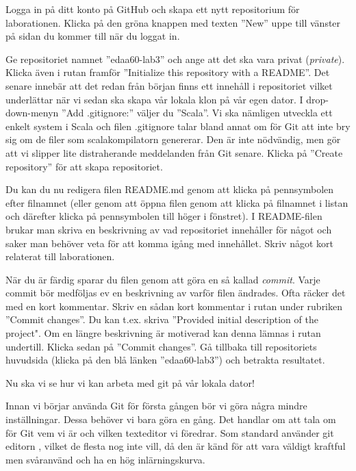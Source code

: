 \begin{Datorarbete}

	\item Logga in på ditt konto på GitHub och skapa ett nytt repositorium för laborationen. Klicka på den gröna knappen med texten ''New'' uppe till vänster på sidan du kommer till när du loggat in.

	Ge repositoriet namnet ''edaa60-lab3'' och ange att det ska vara privat (\emph{private}). Klicka även i rutan framför ''Initialize this repository with a README''. Det senare innebär att det redan från början finns ett innehåll i repositoriet vilket underlättar när vi sedan ska skapa vår lokala klon på vår egen dator. I drop-down-menyn ''Add .gitignore:'' väljer du ''Scala''. Vi ska nämligen utveckla ett enkelt system i Scala och filen .gitignore talar bland annat om för Git att inte bry sig om de filer som scalakompilatorn genererar. Den är inte nödvändig, men gör att vi slipper lite distraherande meddelanden från Git senare. Klicka på ''Create repository'' för att skapa repositoriet.

	Du kan du nu redigera filen README.md genom att klicka på pennsymbolen efter filnamnet (eller genom att öppna filen genom att klicka på filnamnet i listan och därefter klicka på pennsymbolen till höger i fönstret). I README-filen brukar man skriva en beskrivning av vad repositoriet innehåller för något och saker man behöver veta för att komma igång med innehållet. Skriv något kort relaterat till laborationen.

	När du är färdig sparar du filen genom att göra en så kallad \emph{commit}. Varje commit bör medföljas ev en beskrivning av varför filen ändrades. Ofta räcker det med en kort kommentar. Skriv en sådan kort kommentar i rutan under rubriken ''Commit changes''. Du kan t.ex. skriva ''Provided initial description of the project". Om en längre beskrivning är motiverad kan denna lämnas i rutan undertill. Klicka sedan på ''Commit changes''. Gå tillbaka till repositoriets huvudsida (klicka på den blå länken ''edaa60-lab3'') och betrakta resultatet.

	Nu ska vi se hur vi kan arbeta med git på vår lokala dator!

	\item Innan vi börjar använda Git för första gången bör vi göra några mindre inställningar. Dessa behöver vi bara göra en gång. Det handlar om att tala om för Git vem vi är och vilken texteditor vi föredrar. Som standard använder git editorn , vilket de flesta nog inte vill, då den är känd för att vara väldigt kraftful men svåranvänd och ha en hög inlärningskurva.
	\\


\end{Datorarbete}
